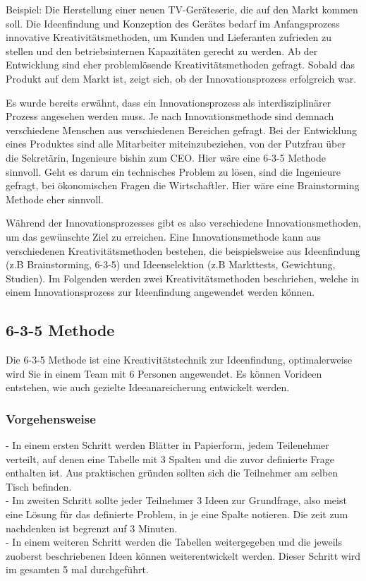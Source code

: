 Beispiel: Die Herstellung einer neuen TV-Geräteserie, die auf den Markt kommen soll. Die Ideenfindung und Konzeption des Gerätes bedarf im Anfangsprozess innovative Kreativitätsmethoden, um Kunden und Lieferanten zufrieden zu stellen und den betriebsinternen Kapazitäten gerecht zu werden. Ab der Entwicklung sind eher problemlösende Kreativitätsmethoden gefragt. Sobald das Produkt auf dem Markt ist, zeigt sich, ob der Innovationsprozess erfolgreich war.

Es wurde bereits erwähnt, dass ein Innovationsprozess als interdisziplinärer Prozess angesehen werden muss. Je nach Innovationsmethode sind demnach verschiedene Menschen aus verschiedenen Bereichen gefragt. Bei der Entwicklung eines Produktes sind alle Mitarbeiter miteinzubeziehen, von der Putzfrau über die Sekretärin, Ingenieure bishin zum CEO. Hier wäre eine 6-3-5 Methode sinnvoll. Geht es darum ein technisches Problem zu lösen, sind die Ingenieure gefragt, bei ökonomischen Fragen die Wirtschaftler. Hier wäre eine Brainstorming Methode eher sinnvoll.

Während der Innovationsprozesses gibt es also verschiedene Innovationsmethoden, um das gewünschte Ziel zu erreichen. Eine Innovationsmethode kann aus verschiedenen Kreativitätsmethoden bestehen, die beispielsweise aus Ideenfindung (z.B Brainstorming, 6-3-5) und Ideenselektion (z.B Markttests, Gewichtung, Studien). Im Folgenden werden zwei Kreativitätsmethoden beschrieben, welche in einem Innovationsprozess zur Ideenfindung angewendet werden können.



\subsection{6-3-5 Methode}\label{subsec:635Methode}
Die 6-3-5 Methode ist eine Kreativitätstechnik zur Ideenfindung, optimalerweise wird Sie in einem Team mit 6 Personen angewendet. Es können Vorideen entstehen, wie auch gezielte Ideeanareicherung entwickelt werden.
\subsubsection{Vorgehensweise}
- In einem ersten Schritt werden Blätter in Papierform, jedem Teilenehmer verteilt, auf denen eine Tabelle mit 3 Spalten und die zuvor definierte Frage enthalten ist. Aus praktischen gründen sollten sich die Teilnehmer am selben Tisch befinden.\\
- Im zweiten Schritt sollte jeder Teilnehmer 3 Ideen zur Grundfrage, also meist eine Lösung für das definierte Problem, in je eine Spalte notieren. Die zeit zum nachdenken ist begrenzt auf 3 Minuten.\\
- In einem weiteren Schritt werden die Tabellen weitergegeben und die jeweils zuoberst beschriebenen Ideen können weiterentwickelt werden. Dieser Schritt wird im gesamten 5 mal durchgeführt.
